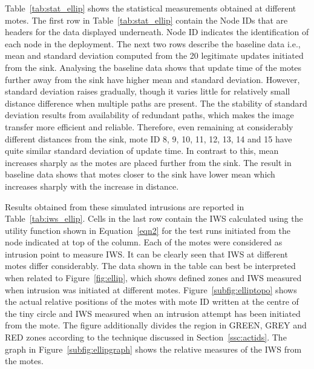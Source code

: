 \documentclass[conference,manuscript]{IEEEtran}
\newcommand{\notedme}[1]{\raisebox{0pt}[0pt][0pt]{\pdfcomment[open=true,color=blue]{#1}}}
\begin{document}
Table~\ref{tab:stat_ellip} shows the statistical measurements obtained at different motes.
The first row in Table~\ref{tab:stat_ellip} contain the Node IDs that are headers for the data displayed underneath.
Node ID indicates the identification of each node in the deployment.
The next two rows describe the baseline data i.e., mean and standard deviation computed from the 20 legitimate updates initiated from the sink.
Analysing the baseline data shows that update time of the motes further away from the sink have higher mean and standard deviation.  
However, standard deviation raises gradually, though it varies little for relatively small distance difference when multiple paths are present.
The the stability of standard deviation results from availability of redundant paths, which makes the image transfer more efficient and reliable.
Therefore, even remaining at considerably different distances from the sink, mote ID 8, 9, 10, 11, 12, 13, 14 and 15  have quite similar standard deviation of update time.
In contrast to this, mean increases sharply as the motes are placed further from the sink.
The result in baseline data shows that motes closer to the sink have lower mean which increases sharply with the increase in distance.

Results obtained from these simulated intrusions are reported in Table~\ref{tab:iws_ellip}.
Cells in the last row contain the IWS calculated using  the utility function shown in Equation~\ref{eqn2} for the test runs initiated from the node indicated at top of the column.
Each of the motes were considered as intrusion point to measure IWS.
It can be clearly seen that IWS at different motes differ considerably.
The data shown in the table can best be interpreted when related to Figure~\ref{fig:ellip}, which shows defined zones and IWS measured when intrusion was initiated at different motes.
Figure~\ref{subfig:elliptopo} shows the actual relative positions of the motes with mote ID written at the centre of the tiny circle and IWS measured when an intrusion attempt has been initiated from the mote. 
The figure additionally divides the region in GREEN, GREY and RED zones according to the technique discussed in Section~\ref{ssc:actids}.
The graph in  Figure~\ref{subfig:ellipgraph} shows the relative measures of the IWS from the motes.
\end{document}

